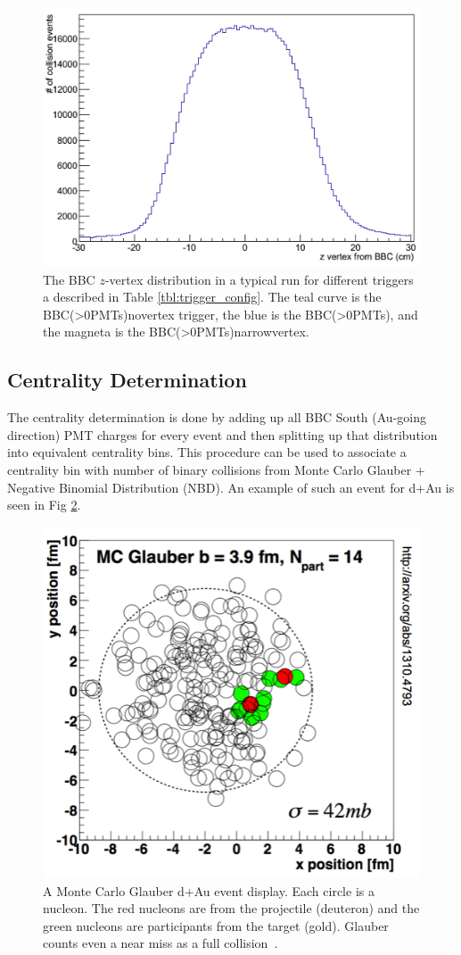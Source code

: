 \begin{figure}[h!]
\begin{center}
\includegraphics[width=0.65\linewidth]{figs/bbc_z_vertex_dist.png}
\caption{The BBC $z$-vertex distribution in a typical \pau run for different triggers a described in Table \ref{tbl:trigger_config}.  The teal curve is the BBC(>0\thinspace PMTs)\thinspace novertex trigger, the blue is the BBC(>0\thinspace PMTs), and the magneta is the BBC(>0\thinspace PMTs)\thinspace narrowvertex.}
\label{fig:bbc_z_vtx_dist}
\end{center}
\end{figure}



\subsection{Centrality Determination}
\label{sec:central_determin}
The centrality determination is done by adding up all BBC South (Au-going direction) PMT charges for every event and then splitting up that distribution into equivalent centrality bins. This procedure can be used to associate a centrality bin with number of binary collisions from Monte Carlo Glauber + Negative Binomial Distribution (NBD). An example of such an event for d+Au is seen in Fig \ref{fig:glauber_event_display}.  
\label{centrality_determination}
\begin{figure}
\begin{center}
\includegraphics[width=0.5\linewidth]{figs/glauber_event_display.png}
\caption{A Monte Carlo Glauber d+Au event display. Each circle is a nucleon. The red nucleons are from the projectile (deuteron) and the green nucleons are participants from the target (gold). Glauber counts even a near miss as a full collision~\cite{PhysRevC.90.034902}.}
\label{fig:glauber_event_display}
\end{center}
\end{figure}

